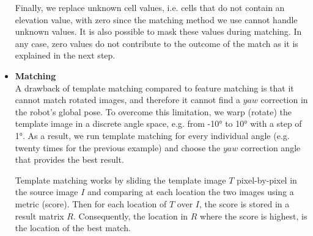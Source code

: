 \begin{itemize}

        Finally, we replace unknown cell values, i.e. cells that do not
        contain an elevation value, with zero since the matching
        method we use cannot handle unknown values. It is also possible
        to mask these values during matching. In any case, zero values
        do not contribute to the outcome of the match as it is explained
        in the next step.

    \item \textbf{Matching} \\
        A drawback of template matching compared to feature matching is that it
        cannot match rotated images, and therefore it cannot find a
        $yaw$ correction in the robot's global pose.
        To overcome this limitation, we warp (rotate) the template image
        in a discrete angle space, e.g. from \ang{-10} to \ang{10} with
        a step of \ang{1}. As a result, we run template matching for every
        individual angle (e.g. twenty times for the previous example) and
        choose the $yaw$ correction angle that provides the best result.

        Template matching works by sliding the template image $T$
        pixel-by-pixel in the source image $I$ and comparing at each
        location the two images using a metric (score).
        Then for each location of $T$ over $I$, the score is stored in a
        result matrix $R$.
        Consequently, the location in $R$ where the score is highest,
        is the location of the best match.



\end{itemize}
